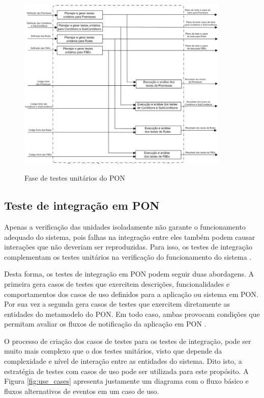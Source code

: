 \begin{figure}[!htb]
  \centering
  \caption{Fase de testes unitários do PON}
  \includegraphics[width=0.9\textwidth]{../figures/unit_pon.png}
  \smallskip
  \label{fig:unit_pon}
\end{figure}

\subsection{Teste de integração em PON}\label{sec:int_pon}

Apenas a verificação das unidades isoladamente não garante o funcionamento
adequado do sistema, pois falhas na integração entre eles também podem causar
interações que não deveriam ser reproduzidas. Para isso, os testes de integração
complementam os testes unitários na verificação do funcionamento do sistema
\cite{binder_1999}.

Desta forma, os testes de integração em PON podem seguir duas abordagens. A
primeira gera casos de testes que exercitem descrições, funcionalidades e
comportamentos dos casos de uso definidos para a aplicação ou sistema em PON.
Por sua vez a segunda gera casos de testes que exercitem diretamente as
entidades do metamodelo do PON. Em todo caso, ambas provocam condições que
permitam avaliar os fluxos de notificação da aplicação em PON
\cite{msc_Kossoski_2015}.

O processo de criação dos casos de testes para os testes de integração, pode ser
muito mais complexo que o dos testes unitários, visto que depende da
complexidade e nível de interação entre as entidades do sistema. Dito isto, a
estratégia de testes com casos de uso pode ser utilizada para este propósito. A
Figura \ref{fig:use_cases} apresenta justamente um diagrama com o fluxo básico e
fluxos alternativos de eventos em um caso de uso. 

